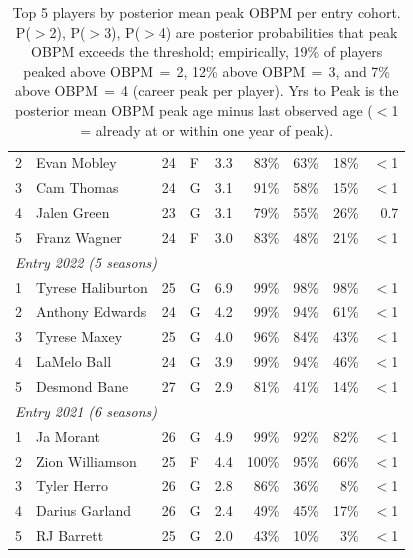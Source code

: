 \begin{table}[htbp]
\begin{tabular}{rlrlrrrrr}
    2 & Evan Mobley & 24 & F & 3.3 & 83\% & 63\% & 18\% & $<$1 \\
    3 & Cam Thomas & 24 & G & 3.1 & 91\% & 58\% & 15\% & $<$1 \\
    4 & Jalen Green & 23 & G & 3.1 & 79\% & 55\% & 26\% & 0.7 \\
    5 & Franz Wagner & 24 & F & 3.0 & 83\% & 48\% & 21\% & $<$1 \\
    \midrule[0.4pt]
    \multicolumn{9}{l}{\textit{Entry 2022 (5 seasons)}} \\
    \midrule
    1 & Tyrese Haliburton & 25 & G & 6.9 & 99\% & 98\% & 98\% & $<$1 \\
    2 & Anthony Edwards & 24 & G & 4.2 & 99\% & 94\% & 61\% & $<$1 \\
    3 & Tyrese Maxey & 25 & G & 4.0 & 96\% & 84\% & 43\% & $<$1 \\
    4 & LaMelo Ball & 24 & G & 3.9 & 99\% & 94\% & 46\% & $<$1 \\
    5 & Desmond Bane & 27 & G & 2.9 & 81\% & 41\% & 14\% & $<$1 \\
    \midrule[0.4pt]
    \multicolumn{9}{l}{\textit{Entry 2021 (6 seasons)}} \\
    \midrule
    1 & Ja Morant & 26 & G & 4.9 & 99\% & 92\% & 82\% & $<$1 \\
    2 & Zion Williamson & 25 & F & 4.4 & 100\% & 95\% & 66\% & $<$1 \\
    3 & Tyler Herro & 26 & G & 2.8 & 86\% & 36\% & 8\% & $<$1 \\
    4 & Darius Garland & 26 & G & 2.4 & 49\% & 45\% & 17\% & $<$1 \\
    5 & RJ Barrett & 25 & G & 2.0 & 43\% & 10\% & 3\% & $<$1 \\
    \bottomrule
  \end{tabular}
  \caption{Top 5 players by posterior mean peak OBPM per entry cohort. P($>$2), P($>$3), P($>$4) are posterior probabilities that peak OBPM exceeds the threshold; empirically, 19\% of players peaked above OBPM\,$=$\,2, 12\% above OBPM\,$=$\,3, and 7\% above OBPM\,$=$\,4 (career peak per player). Yrs to Peak is the posterior mean OBPM peak age minus last observed age ($<$1 = already at or within one year of peak).}
  \label{tab:breakout_cohort}
\end{table}

